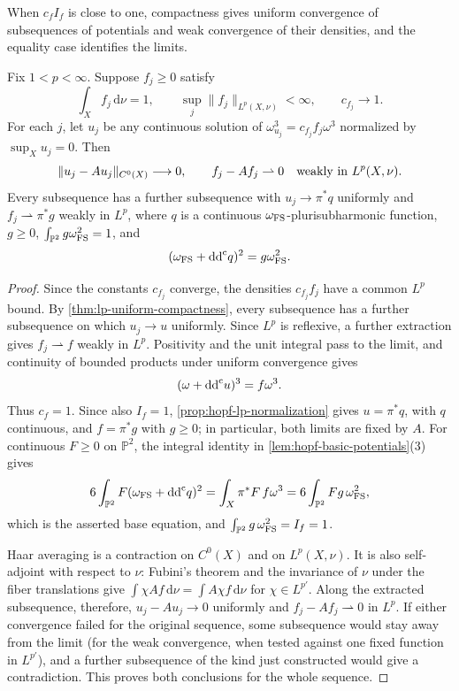 When $c_fI_f$ is close to one, compactness gives uniform convergence of subsequences of potentials and weak convergence of their densities, and the equality case identifies the limits.

\begin{proposition}\label{prop:hopf-near-equality-compactness}
Fix $1<p<\infty$. Suppose $f_j\geq0$ satisfy
\[
 \int_X f_j\,\mathrm{d}\nu=1,\qquad
 \sup_j\|f_j\|_{L^p(X,\nu)}<\infty,\qquad c_{f_j}\longrightarrow1.
\]
For each $j$, let $u_j$ be any continuous solution of $\omega_{u_j}^3=c_{f_j}f_j\omega^3$ normalized by $\sup_Xu_j=0$. Then
\[
 \|u_j-Au_j\|_{C^0(X)}\longrightarrow0,\qquad
 f_j-Af_j\rightharpoonup0\quad\hbox{weakly in }L^p(X,\nu).
\]
Every subsequence has a further subsequence with $u_j\to\pi^*q$ uniformly and $f_j\rightharpoonup\pi^*g$ weakly in $L^p$, where $q$ is a continuous $\omega_{\mathrm{FS}}$-plurisubharmonic function, $g\geq0$, $\int_{\mathbb P^2}g\omega_{\mathrm{FS}}^2=1$, and
\[
 (\omega_{\mathrm{FS}}+\mathrm{dd}^{\mathrm{c}} q)^2=g\omega_{\mathrm{FS}}^2.
\]
\end{proposition}
\begin{proof}
Since the constants $c_{f_j}$ converge, the densities $c_{f_j}f_j$ have a common $L^p$ bound. By \cref{thm:lp-uniform-compactness}, every subsequence has a further subsequence on which $u_j\to u$ uniformly. Since $L^p$ is reflexive, a further extraction gives $f_j\rightharpoonup f$ weakly in $L^p$. Positivity and the unit integral pass to the limit, and continuity of bounded products under uniform convergence gives
\[
 (\omega+\mathrm{dd}^{\mathrm{c}} u)^3=f\omega^3.
\]
Thus $c_f=1$. Since also $I_f=1$, \cref{prop:hopf-lp-normalization} gives $u=\pi^*q$, with $q$ continuous, and $f=\pi^*g$ with $g\geq0$; in particular, both limits are fixed by $A$. For continuous $F\geq0$ on $\mathbb P^2$, the integral identity in \cref{lem:hopf-basic-potentials}(3) gives
\[
 6\int_{\mathbb P^2}F(\omega_{\mathrm{FS}}+\mathrm{dd}^{\mathrm{c}} q)^2=\int_X\pi^*F\,f\omega^3=6\int_{\mathbb P^2}Fg\,\omega_{\mathrm{FS}}^2,
\]
which is the asserted base equation, and $\int_{\mathbb P^2}g\,\omega_{\mathrm{FS}}^2=I_f=1$.

Haar averaging is a contraction on $C^0(X)$ and on $L^p(X,\nu)$. It is also self-adjoint with respect to $\nu$: Fubini's theorem and the invariance of $\nu$ under the fiber translations give $\int\chi Af\,\mathrm{d}\nu=\int A\chi f\,\mathrm{d}\nu$ for $\chi\in L^{p'}$. Along the extracted subsequence, therefore, $u_j-Au_j\to0$ uniformly and $f_j-Af_j\rightharpoonup0$ in $L^p$. If either convergence failed for the original sequence, some subsequence would stay away from the limit (for the weak convergence, when tested against one fixed function in $L^{p'}$), and a further subsequence of the kind just constructed would give a contradiction. This proves both conclusions for the whole sequence.
\end{proof}

